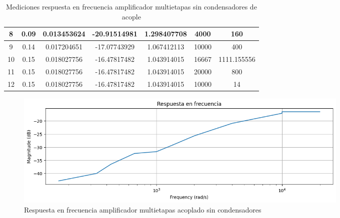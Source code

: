 \begin{table}[h!]
\begin{tabular}{|c|c|c|c|c|c|c|}
8 & 0.09 & 0.013453624 & -20.91514981 & 1.298407708 & 4000 & 160 \\ \hline
9 & 0.14 & 0.017204651 & -17.07743929 & 1.067412113 & 10000 & 400 \\ \hline
10 & 0.15 & 0.018027756 & -16.47817482 & 1.043914015 & 16667 & 1111.155556 \\ \hline
11 & 0.15 & 0.018027756 & -16.47817482 & 1.043914015 & 20000 & 800 \\ \hline
12 & 0.15 & 0.018027756 & -16.47817482 & 1.043914015 & 10000 & 14 \\ \hline
\end{tabular}
\caption{Mediciones respuesta en frecuencia amplificador multietapas sin condensadores de acople}
\label{tab:med-respuesta-frecuencia-amplificador-multietapas-sin-condensadores-acople}
\end{table}

\begin{figure}[ht]
    \centering
    \includegraphics[width=0.8\textwidth]{src/images/resultados/p4/respuesta en frecuencia practica 4 sin condensadores de acople.png}
    \caption{Respuesta en frecuencia amplificador multietapas acoplado sin condensadores}
    \label{fig:respuesta-frecuencia-amplificador-multietapas-acoplado-sin-condensadores}
\end{figure}
